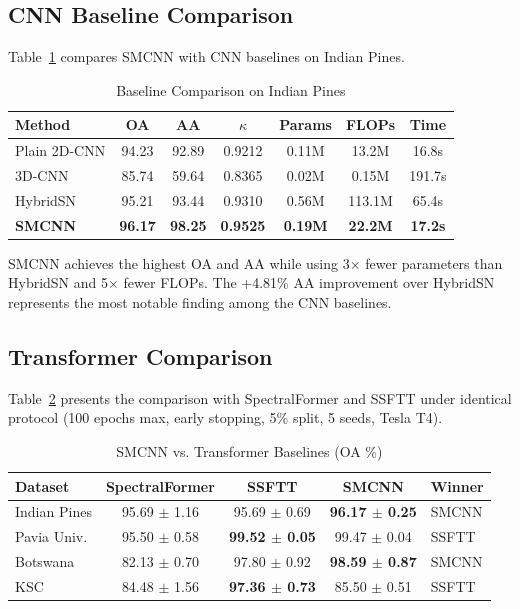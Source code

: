 \documentclass[pdflatex,sn-mathphys-num]{sn-jnl}
\theoremstyle{thmstyleone}
\theoremstyle{thmstyletwo}
\theoremstyle{thmstylethree}
\begin{document}
\subsection{CNN Baseline Comparison}

Table~\ref{tab:baseline} compares SMCNN with CNN baselines on Indian Pines.

\begin{table}[!t]
\caption{Baseline Comparison on Indian Pines}
\label{tab:baseline}
\centering

\begin{tabular}{lcccccc}
\toprule
\textbf{Method} & \textbf{OA} & \textbf{AA} & \textbf{$\kappa$} & \textbf{Params} & \textbf{FLOPs} & \textbf{Time} \\
\midrule
Plain 2D-CNN & 94.23 & 92.89 & 0.9212 & 0.11M & 13.2M & 16.8s \\
3D-CNN & 85.74 & 59.64 & 0.8365 & 0.02M & 0.15M & 191.7s \\
HybridSN & 95.21 & 93.44 & 0.9310 & 0.56M & 113.1M & 65.4s \\
\textbf{SMCNN} & \textbf{96.17} & \textbf{98.25} & \textbf{0.9525} & \textbf{0.19M} & \textbf{22.2M} & \textbf{17.2s} \\
\bottomrule
\end{tabular}
\end{table}

SMCNN achieves the highest OA and AA while using 3$\times$ fewer parameters than HybridSN and 5$\times$ fewer FLOPs. The +4.81\% AA improvement over HybridSN represents the most notable finding among the CNN baselines.

\subsection{Transformer Comparison}

Table~\ref{tab:transformer} presents the comparison with SpectralFormer and SSFTT under identical protocol (100 epochs max, early stopping, 5\% split, 5 seeds, Tesla T4).

\begin{table}[!t]
\caption{SMCNN vs. Transformer Baselines (OA \%)}
\label{tab:transformer}
\centering

\begin{tabular}{lcccl}
\toprule
\textbf{Dataset} & \textbf{SpectralFormer} & \textbf{SSFTT} & \textbf{SMCNN} & \textbf{Winner} \\
\midrule
Indian Pines & 95.69 $\pm$ 1.16 & 95.69 $\pm$ 0.69 & \textbf{96.17 $\pm$ 0.25} & SMCNN \\
Pavia Univ. & 95.50 $\pm$ 0.58 & \textbf{99.52 $\pm$ 0.05} & 99.47 $\pm$ 0.04 & SSFTT \\
Botswana & 82.13 $\pm$ 0.70 & 97.80 $\pm$ 0.92 & \textbf{98.59 $\pm$ 0.87} & SMCNN \\
KSC & 84.48 $\pm$ 1.56 & \textbf{97.36 $\pm$ 0.73} & 85.50 $\pm$ 0.51 & SSFTT \\
\bottomrule
\end{tabular}
\end{table}
\end{document}
